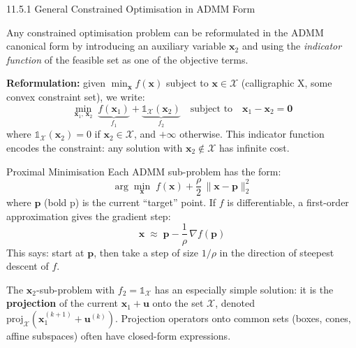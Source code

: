\documentclass[aspectratio=169,10pt]{beamer}
\newcommand{\bx}{\mathbf{x}}
\newcommand{\bu}{\mathbf{u}}
\newcommand{\grad}{\nabla}
\newcommand{\bp}{\mathbf{p}}
\begin{document}
\begin{frame}[allowframebreaks]{11.5.1 General Constrained Optimisation in ADMM Form}

  Any constrained optimisation problem can be reformulated in the ADMM
  canonical form by introducing an auxiliary variable $\bx_2$ and using
  the \emph{indicator function} of the feasible set as one of the
  objective terms.

  \medskip
  \textbf{Reformulation:} given $\min_\bx f(\bx)$ subject to
  $\bx \in \mathcal{X}$ (calligraphic X, some convex constraint set),
  we write:
  \[
    \min_{\bx_1,\, \bx_2}\;
    \underbrace{f(\bx_1)}_{f_1}
    + \underbrace{\mathbb{1}_{\mathcal{X}}(\bx_2)}_{f_2}
    \quad \text{subject to} \quad \bx_1 - \bx_2 = \mathbf{0}
  \]
  where $\mathbb{1}_{\mathcal{X}}(\bx_2) = 0$ if $\bx_2 \in \mathcal{X}$,
  and $+\infty$ otherwise.  This indicator function encodes the constraint:
  any solution with $\bx_2 \notin \mathcal{X}$ has infinite cost.

  \begin{block}{Proximal Minimisation}
    Each ADMM sub-problem has the form:
    \[
      \arg\min_{\bx}\; f(\bx) + \frac{\rho}{2}\,\|\bx - \bp\|_2^2
    \]
    where $\bp$ (bold p) is the current ``target'' point.  If $f$ is
    differentiable, a first-order approximation gives the gradient step:
    \[
      \bx \;\approx\; \bp - \frac{1}{\rho}\,\grad f(\bp)
    \]
    This says: start at $\bp$, then take a step of size $1/\rho$ in the
    direction of steepest descent of $f$.
  \end{block}

  The $\bx_2$-sub-problem with $f_2 = \mathbb{1}_{\mathcal{X}}$ has an
  especially simple solution: it is the \textbf{projection} of the current
  $\bx_1 + \bu$ onto the set $\mathcal{X}$, denoted
  $\text{proj}_{\mathcal{X}}(\bx_1^{(k+1)} + \bu^{(k)})$.  Projection
  operators onto common sets (boxes, cones, affine subspaces) often have
  closed-form expressions.

\end{frame}
\end{document}
